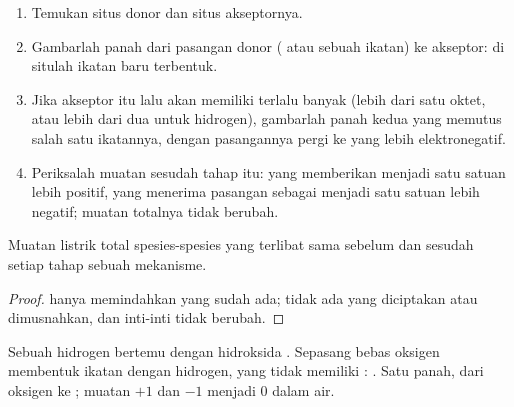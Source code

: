 \begin{method}\label{met:g12:curly-arrows:drawing}
\begin{enumerate}
  \item Temukan situs donor dan situs akseptornya.
  \item Gambarlah panah dari pasangan donor ( atau
        sebuah ikatan) ke  akseptor: di situlah ikatan baru
        terbentuk.
  \item Jika  akseptor itu lalu akan memiliki terlalu banyak 
        (lebih dari satu oktet, atau lebih dari dua untuk hidrogen),
        gambarlah panah kedua yang memutus salah satu ikatannya, dengan
        pasangannya pergi ke  yang lebih elektronegatif.
  \item Periksalah muatan sesudah tahap itu:  yang memberikan
         menjadi satu satuan lebih positif, 
        yang menerima pasangan sebagai  menjadi
        satu satuan lebih negatif; muatan totalnya tidak berubah.
\end{enumerate}
\end{method}

\begin{proposition}\label{prop:g12:curly-arrows:charge}
Muatan listrik total spesies-spesies yang terlibat sama sebelum dan
sesudah setiap tahap sebuah mekanisme.
\end{proposition}

\begin{proof}
 hanya memindahkan  yang sudah ada; tidak ada
 yang diciptakan atau dimusnahkan, dan inti-inti  tidak
berubah.
\end{proof}

\begin{example}\label{ex:g12:curly-arrows:first}
Sebuah  hidrogen  bertemu dengan  hidroksida .
Sepasang  bebas oksigen membentuk ikatan dengan  hidrogen,
yang tidak memiliki : . Satu panah, dari
 oksigen ke ; muatan $+1$ dan $-1$ menjadi
0 dalam  air.
\end{example}

